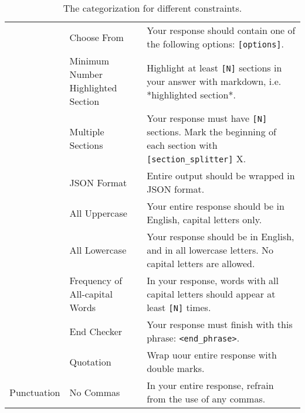 \begin{table*}
\begin{tabular}{>{\raggedright}m{3cm}|m{4cm}|m{9cm}}
\cline{2-3}
 & Choose From & Your response should contain one of the following options: \texttt{[options]}. \\
\cline{2-3}
 & Minimum Number Highlighted Section & Highlight at least \texttt{[N]} sections in your answer with markdown, i.e.  *highlighted section*. \\
\cline{2-3}
 & Multiple Sections & Your response must have \texttt{[N]} sections. Mark the beginning of each section with \texttt{[section\_splitter]} X. \\
\cline{2-3}
 & JSON Format & Entire output should be wrapped in JSON format. \\
\hline
\multirow{3}{*}{ChangeCase} & All Uppercase & Your entire response should be in English, capital letters only. \\
\cline{2-3}
 & All Lowercase & Your response should be in English, and in all lowercase letters. No capital letters are allowed. \\
\cline{2-3}
& Frequency of All-capital Words & In your response, words with all capital letters should appear at least \texttt{[N]} times. \\
\hline
\multirow{2}{*}{StartEnd} & End Checker & Your response must finish with this phrase: \texttt{<end\_phrase>}.  \\
\cline{2-3}
& Quotation & Wrap uour entire response with double marks. \\
\hline
Punctuation & No Commas & In your entire response, refrain from the use of any commas. \\
\hline
\end{tabular}
\caption{The categorization for different constraints.}
\label{tab:ifeval}
\end{table*}


